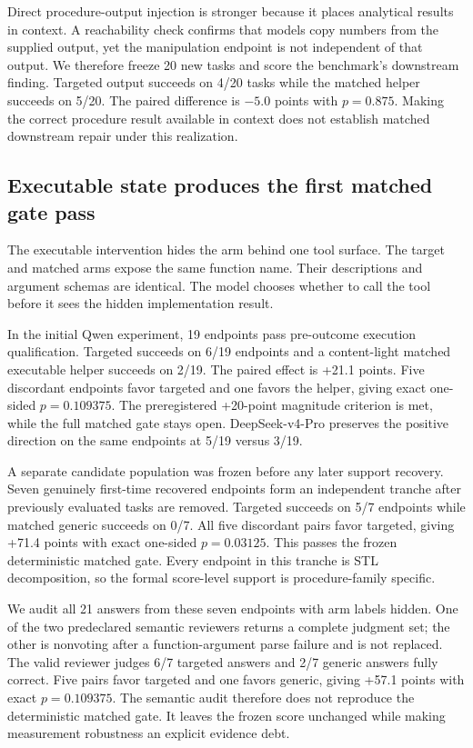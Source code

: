 Direct procedure-output injection is stronger because it places analytical results in context. A reachability check confirms that models copy numbers from the supplied output, yet the manipulation endpoint is not independent of that output. We therefore freeze 20 new tasks and score the benchmark's downstream finding. Targeted output succeeds on 4/20 tasks while the matched helper succeeds on 5/20. The paired difference is $-5.0$ points with $p=0.875$. Making the correct procedure result available in context does not establish matched downstream repair under this realization.

\subsection{Executable state produces the first matched gate pass}
The executable intervention hides the arm behind one tool surface. The target and matched arms expose the same function name. Their descriptions and argument schemas are identical. The model chooses whether to call the tool before it sees the hidden implementation result.

In the initial Qwen experiment, 19 endpoints pass pre-outcome execution qualification. Targeted succeeds on 6/19 endpoints and a content-light matched executable helper succeeds on 2/19. The paired effect is +21.1 points. Five discordant endpoints favor targeted and one favors the helper, giving exact one-sided $p=0.109375$. The preregistered +20-point magnitude criterion is met, while the full matched gate stays open. DeepSeek-v4-Pro preserves the positive direction on the same endpoints at 5/19 versus 3/19.

A separate candidate population was frozen before any later support recovery. Seven genuinely first-time recovered endpoints form an independent tranche after previously evaluated tasks are removed. Targeted succeeds on 5/7 endpoints while matched generic succeeds on 0/7. All five discordant pairs favor targeted, giving +71.4 points with exact one-sided $p=0.03125$. This passes the frozen deterministic matched gate. Every endpoint in this tranche is STL decomposition, so the formal score-level support is procedure-family specific.

We audit all 21 answers from these seven endpoints with arm labels hidden. One of the two predeclared semantic reviewers returns a complete judgment set; the other is nonvoting after a function-argument parse failure and is not replaced. The valid reviewer judges 6/7 targeted answers and 2/7 generic answers fully correct. Five pairs favor targeted and one favors generic, giving +57.1 points with exact $p=0.109375$. The semantic audit therefore does not reproduce the deterministic matched gate. It leaves the frozen score unchanged while making measurement robustness an explicit evidence debt.

